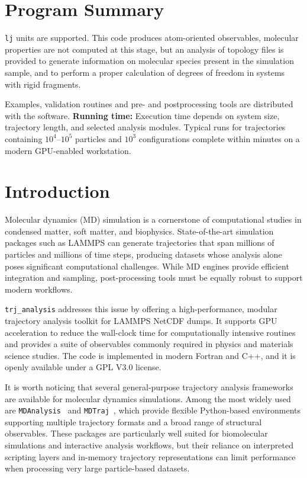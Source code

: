 \documentclass[final,1p,times]{elsarticle}
\newenvironment{programsummary}{%
\section*{Program Summary}
\begin{description}
\setlength{\itemsep}{0.2em}
}{%
\end{description}
}
\begin{document}
\begin{programsummary}
\texttt{lj} units are supported. This code produces atom-oriented
observables, molecular properties are not computed at this stage, but
an analysis of topology files is provided to generate information on
molecular species present in the simulation sample, and to perform a proper calculation of
degrees of freedom in systems with rigid fragments. 
\item[Additional comments:]
Examples, validation routines and pre- and postprocessing tools are distributed with the software. \textbf{Running time:} Execution time depends on system size, trajectory length, and selected analysis modules. Typical runs for trajectories containing $10^4$--$10^5$ particles and $10^3$ configurations complete within minutes on a modern GPU-enabled workstation.
\end{programsummary}


\section{Introduction}

Molecular dynamics (MD) simulation is a cornerstone of computational studies in condensed matter, soft matter, and biophysics. State-of-the-art simulation packages such as LAMMPS\cite{Thompson2021} can generate trajectories that span millions of particles and millions of time steps, producing datasets whose analysis alone poses significant computational challenges. While MD engines provide efficient integration and sampling, post-processing tools must be equally robust to support modern workflows.

\texttt{trj\_analysis} addresses this issue by offering a high-performance, modular trajectory analysis toolkit for LAMMPS NetCDF dumps\cite{Rew1990}. It supports GPU acceleration to reduce the wall-clock time for computationally intensive routines and provides a suite of observables commonly required in physics and materials science studies. The code is implemented in modern Fortran and C++, and it is openly available under a GPL V3.0 license.

It is worth noticing that several general-purpose trajectory analysis frameworks are available for molecular dynamics simulations. Among the most widely used are \texttt{MDAnalysis}~\cite{MDAnalysis2011,MDAnalysis2016} and \texttt{MDTraj}~\cite{MDTraj2015}, which provide flexible Python-based environments supporting multiple trajectory formats and a broad range of structural observables. These packages are particularly well suited for biomolecular simulations and interactive analysis workflows, but their reliance on interpreted scripting layers and in-memory trajectory representations can limit performance when processing very large particle-based datasets.
\end{document}
